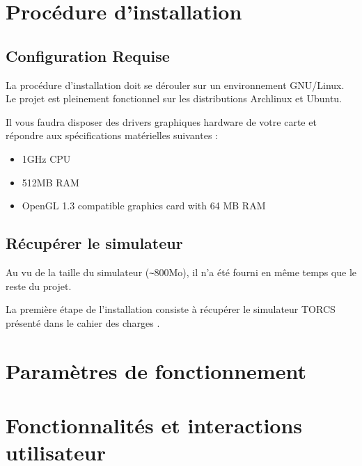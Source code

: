 \documentclass[a4paper,12pt]{article}
\begin{document}
  \begin{titlepage}
   \def\titletype{Manuel de l’utilisateur}
   
  \end{titlepage}

  
  \clearpage

  \tableofcontents
  

  \clearpage
  
  \renewcommand{\labelitemi}{$\bullet$}
  \renewcommand{\labelitemii}{$\circ$}
  \renewcommand{\labelitemiii}{$\diamond$}
  \renewcommand{\labelitemiv}{$\ast$}
  
  \section{Procédure d’installation}

  \subsection{Configuration Requise}
  La procédure d'installation doit se dérouler sur un environnement GNU/Linux.
  Le projet est pleinement fonctionnel sur les distributions Archlinux et Ubuntu.
 
  Il vous faudra disposer des drivers graphiques hardware de votre carte et répondre aux spécifications
  matérielles suivantes :
   \begin{itemize}
    \item 1GHz CPU
    \item 512MB RAM
    \item OpenGL 1.3 compatible graphics card with 64 MB RAM
   \end{itemize}
 
  \subsection{Récupérer le simulateur}
  Au vu de la taille du simulateur (\verb+~+800Mo), il n'a été fourni en même temps que le reste du projet.
  
  La première étape de l'installation consiste à récupérer le simulateur TORCS \cite{TORCS} présenté
  dans le cahier des charges \cite{CdC}.
 
 
 
  \section{Paramètres de fonctionnement}


  
  
  
  \section{Fonctionnalités et interactions utilisateur}

  
  



\end{document}
